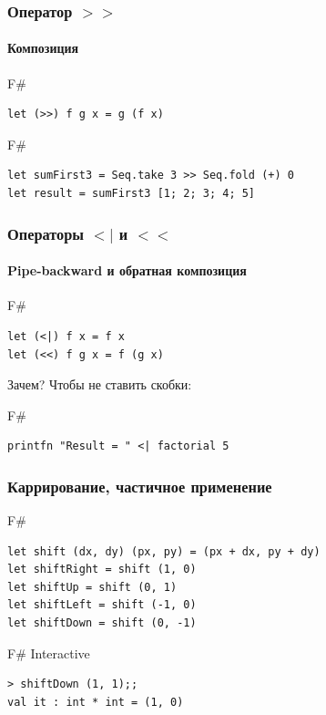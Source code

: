\documentclass[xetex,mathserif,serif]{beamer}
\begin{document}
	\begin{frame}[fragile]
		\frametitle{Оператор $>>$}
		\framesubtitle{Композиция}
		\begin{exampleblock}{F\#}
			\begin{verbatim}
let (>>) f g x = g (f x)
			\end{verbatim}
		\end{exampleblock}
		\begin{exampleblock}{F\#}
			\begin{verbatim}
let sumFirst3 = Seq.take 3 >> Seq.fold (+) 0
let result = sumFirst3 [1; 2; 3; 4; 5]
			\end{verbatim}
		\end{exampleblock}
\end{frame}

	\begin{frame}[fragile]
		\frametitle{Операторы $<|$ и $<<$}
		\framesubtitle{Pipe-backward и обратная композиция}
		\begin{exampleblock}{F\#}
			\begin{verbatim}
let (<|) f x = f x
let (<<) f g x = f (g x)
			\end{verbatim}
		\end{exampleblock}
		Зачем? Чтобы не ставить скобки:
		\begin{exampleblock}{F\#}
			\begin{verbatim}
printfn "Result = " <| factorial 5
			\end{verbatim}
		\end{exampleblock}
\end{frame}

	\begin{frame}[fragile]
		\frametitle{Каррирование, частичное применение}
		\begin{exampleblock}{F\#}
			\begin{verbatim}
let shift (dx, dy) (px, py) = (px + dx, py + dy)
let shiftRight = shift (1, 0)
let shiftUp = shift (0, 1)
let shiftLeft = shift (-1, 0)
let shiftDown = shift (0, -1)
			\end{verbatim}
		\end{exampleblock}
		\begin{alertblock}{F\# Interactive}
			\begin{verbatim}
> shiftDown (1, 1);;
val it : int * int = (1, 0)
			\end{verbatim}
		\end{alertblock}
\end{frame}
\end{document}
